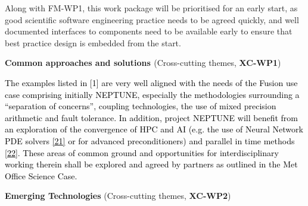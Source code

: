 \documentclass[a4paper]{article}
\newcommand\textstyleInternetlink[1]{\textcolor{blue}{#1}}
\begin{document}
\bigskip

Along with FM-WP1, this work package will be prioritised for an early start, as good scientific software engineering
practice needs to be agreed quickly, and well documented interfaces to components need to be available early to ensure
that best practice design is embedded from the start.


\bigskip

\textbf{\textcolor[rgb]{0.12156863,0.28627452,0.49019608}{Common approaches and solutions
}}\textcolor[rgb]{0.12156863,0.28627452,0.49019608}{(Cross-cutting themes,
}\textbf{\textcolor[rgb]{0.12156863,0.28627452,0.49019608}{XC-WP1}}\textcolor[rgb]{0.12156863,0.28627452,0.49019608}{)}


\bigskip

\textcolor{black}{The examples listed in [1] are very well aligned with the needs of the Fusion use case comprising
initially NEPTUNE, especially the methodologies surrounding a ``separation of concerns'', coupling technologies, the
use of mixed precision arithmetic and fault tolerance. In addition, project NEPTUNE will benefit from an exploration of
the convergence of HPC and AI (e.g. the use of Neural Network PDE solvers
}\href{https://arxiv.org/abs/1906.01200}{\textstyleInternetlink{\textcolor{black}{[21]}}}\textstyleInternetlink{\textcolor{black}{
or for advanced preconditioners}}\textcolor{black}{) and parallel in time methods
}\href{https://parallel-in-time.org/}{\textstyleInternetlink{\textcolor{black}{[22]}}}\textcolor{black}{. These areas
of common ground and opportunities for interdisciplinary working therein shall be explored and agreed by partners as
outlined in the Met Office Science Case.}


\bigskip

\textbf{\textcolor[rgb]{0.12156863,0.28627452,0.49019608}{Emerging
Technologies}}\textcolor[rgb]{0.12156863,0.28627452,0.49019608}{ (Cross-cutting themes,
}\textbf{\textcolor[rgb]{0.12156863,0.28627452,0.49019608}{XC-WP2}}\textcolor[rgb]{0.12156863,0.28627452,0.49019608}{)}


\bigskip
\end{document}
